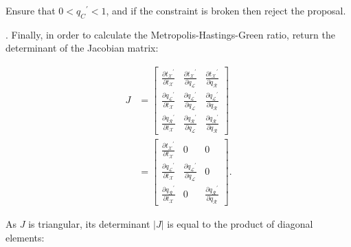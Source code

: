 \documentclass[12pt]{article}
\begin{document}
Ensure that $0 < {q_C}^\prime < 1$, and if the constraint is broken then reject the proposal. 



. Finally, in order to calculate the Metropolis-Hastings-Green ratio, return the determinant of the Jacobian matrix:



\begin{align}
	J &= \begin{bmatrix} \frac{\partial {t_\mathcal{X}}^\prime}{\partial t_\mathcal{X}} & \frac{\partial {t_\mathcal{X}}^\prime}{\partial q_\mathcal{L}} & \frac{\partial {t_\mathcal{X}}^\prime}{\partial q_\mathcal{R}} \\
						\frac{\partial {q_\mathcal{L}}^\prime}{\partial t_\mathcal{X}} & \frac{\partial {q_\mathcal{L}}^\prime}{\partial q_\mathcal{L}} & \frac{\partial {q_\mathcal{L}}^\prime}{\partial q_\mathcal{R}} \\
						\frac{\partial {q_\mathcal{R}}^\prime}{\partial t_\mathcal{X}} & \frac{\partial {q_\mathcal{R}}^\prime}{\partial q_\mathcal{L}} & \frac{\partial {q_\mathcal{R}}^\prime}{\partial q_\mathcal{R}} \end{bmatrix} \nonumber \\
		&= \begin{bmatrix} \frac{\partial {t_\mathcal{X}}^\prime}{\partial t_\mathcal{X}} & 0 & 0 \\
						\frac{\partial {q_\mathcal{L}}^\prime}{\partial t_\mathcal{X}} & \frac{\partial {q_\mathcal{L}}^\prime}{\partial q_\mathcal{L}} & 0\\
						\frac{\partial {q_\mathcal{R}}^\prime}{\partial t_\mathcal{X}} & 0 & \frac{\partial {q_\mathcal{R}}^\prime}{\partial q_\mathcal{R}} \end{bmatrix}.
\end{align}



As $J$ is triangular, its determinant $|J|$ is equal to the product of diagonal elements:
\end{document}
